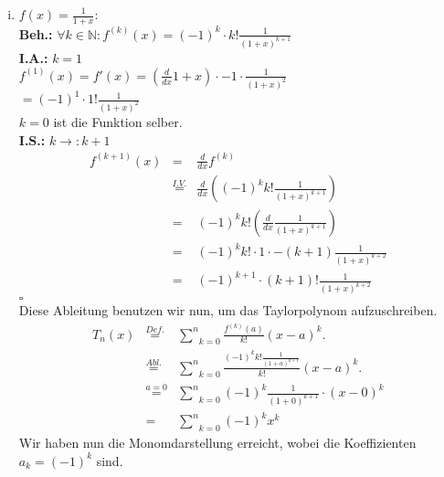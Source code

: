 \documentclass[11pt,a4paper,ngerman]{article}
\begin{document}
\begin{enumerate}[(i)]
    \item $f(x) = \frac{1}{1+x}$:\\
        \textbf{Beh.:} $\forall k \in \mathbb{N} : f^{(k)}(x) = (-1)^{k}\cdot k! \frac{1}{(1+x)^{k+1}}$\\
        \textbf{I.A.:} $k=1$\\
            $f^{(1)}(x) = f'(x) = (\frac{d}{dx} 1 + x) \cdot -1 \cdot \frac{1}{(1+x)^2}$\\
            $= (-1)^1 \cdot 1! \frac{1}{(1+x)^2}$\\
            $k=0$ ist die Funktion selber.\\
        \textbf{I.S.:} $k \rightarrow: k+1$\\
            $$\begin{array}{rcl}
                f^{(k+1)}(x)    &=& \frac{d}{dx} f^{(k)}\\
                        &\stackrel{I.V.}{=}&
                            \frac{d}{dx} \left( (-1)^{k}k! \frac{1}{(1+x)^{k+1}} \right)\\
                        &=& (-1)^k k! \left(\frac{d}{dx} \frac{1}{(1+x)^{k+1}}\right)\\
                        &=& (-1)^k k! \cdot 1 \cdot -(k+1) \frac{1}{(1+x)^{k+2}}\\
                        &=& (-1)^{k+1} \cdot (k+1)! \frac{1}{(1+x)^{k+2}}
            \end{array}$$
        \mbox{} \hfill $\square$\\

        Diese Ableitung benutzen wir nun, um das Taylorpolynom aufzuschreiben.\\
        $$\begin{array}{rcl}
            T_n(x) &\stackrel{Def.}{=}& \underset{k=0}{\overset{n}{\sum}} \frac{f^{(k)}(a)}{k!}(x-a)^k.\\
                &\stackrel{Abl.}{=}& \underset{k=0}{\overset{n}{\sum}} 
                    \frac{(-1)^k k! \frac{1}{(1+a)^{k+1}}}{k!}(x-a)^k.\\
                &\stackrel{a=0}{=}&\underset{k=0}{\overset{n}{\sum}} 
                    (-1)^k \frac{1}{(1+0)^{k+1}} \cdot (x-0)^k\\
                &=& \underset{k=0}{\overset{n}{\sum}}
                    (-1)^k x^k 
        \end{array}$$
        Wir haben nun die Monomdarstellung erreicht, wobei die Koeffizienten $a_k = (-1)^k$ sind.


\end{enumerate}
\end{document}

